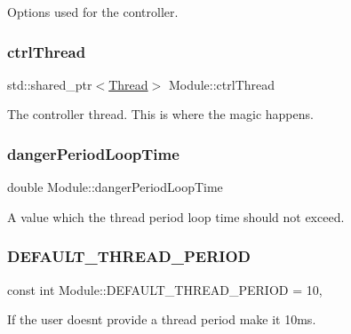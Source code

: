 Options used for the controller. \hypertarget{classModule_a39346aa2e2a00801e07f4c127ff004ba}{}\label{classModule_a39346aa2e2a00801e07f4c127ff004ba} 
\subsubsection{\texorpdfstring{ctrl\+Thread}{ctrlThread}}
{\footnotesize\ttfamily std\+::shared\+\_\+ptr$<$\hyperlink{classThread}{Thread}$>$ Module\+::ctrl\+Thread\hspace{0.3cm}{\ttfamily [private]}}

The controller thread. This is where the magic happens. \hypertarget{classModule_a33fee1e7f977b4f27a2e1488480996fb}{}\label{classModule_a33fee1e7f977b4f27a2e1488480996fb} 
\subsubsection{\texorpdfstring{danger\+Period\+Loop\+Time}{dangerPeriodLoopTime}}
{\footnotesize\ttfamily double Module\+::danger\+Period\+Loop\+Time\hspace{0.3cm}{\ttfamily [private]}}

A value which the thread period loop time should not exceed. \hypertarget{classModule_af73cdfdae53c52ea8488d0d8c4f9083f}{}\label{classModule_af73cdfdae53c52ea8488d0d8c4f9083f} 
\subsubsection{\texorpdfstring{D\+E\+F\+A\+U\+L\+T\+\_\+\+T\+H\+R\+E\+A\+D\+\_\+\+P\+E\+R\+I\+OD}{DEFAULT\_THREAD\_PERIOD}}
{\footnotesize\ttfamily const int Module\+::\+D\+E\+F\+A\+U\+L\+T\+\_\+\+T\+H\+R\+E\+A\+D\+\_\+\+P\+E\+R\+I\+OD = 10\hspace{0.3cm}{\ttfamily [static]}, {\ttfamily [private]}}

If the user doesn\textquotesingle{}t provide a thread period make it 10ms. \hypertarget{classModule_a0d3efedabcef6ec0db88011ccc2e7205}{}\label{classModule_a0d3efedabcef6ec0db88011ccc2e7205} 
